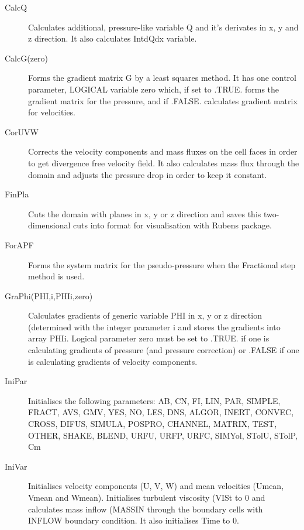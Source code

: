 \documentclass[10pt]{article}
\newcommand*{\tc}{\ttfamily} %
\begin{document}
\begin{description}
    \item[\tc CalcQ] Calculates additional, pressure-like variable
      Q and it's derivates in x, y and z direction. It also calculates
      IntdQdx variable. 

    \item[\tc CalcG(zero)] Forms the gradient matrix {\tc G} by a 
      least squares method. It has one control parameter, LOGICAL
      variable {\tc zero} which, if set to {\tc .TRUE.} forms
      the gradient matrix for the pressure, and if {\tc .FALSE.}
      calculates gradient matrix for velocities.

    \item[\tc CorUVW] Corrects the velocity components and
      mass fluxes on the cell faces in order to get divergence
      free velocity field. It also calculates mass flux through
      the domain and adjusts the pressure drop in order to keep
      it constant.

    \item[\tc FinPla] Cuts the domain with planes in x, y 
      or z direction and saves this two-dimensional cuts into
      format for visualisation with Rubens package.

    \item[\tc ForAPF] Forms the system matrix for the 
      pseudo-pressure when the Fractional step method is 
      used.

    \item[\tc GraPhi(PHI,i,PHIi,zero)] Calculates gradients
      of generic variable {\tc PHI} in x, y or z direction
      (determined with the integer parameter {\tc i} and stores 
      the gradients into array {\tc PHIi}. Logical parameter
      {\tc zero} must be set to {\tc .TRUE.} if one is calculating
      gradients of pressure (and pressure correction) or 
      {\tc .FALSE} if one is calculating gradients of velocity
      components.

    \item[\tc IniPar] Initialises the following parameters:
      {\tc AB}, {\tc CN}, {\tc FI}, {\tc LIN}, {\tc PAR}, 
      {\tc SIMPLE}, {\tc FRACT}, {\tc AVS}, {\tc GMV}, 
      {\tc YES}, {\tc NO}, {\tc LES}, {\tc DNS}, {\tc ALGOR}, 
      {\tc INERT}, {\tc CONVEC}, {\tc CROSS}, {\tc DIFUS}, 
      {\tc SIMULA}, {\tc POSPRO}, {\tc CHANNEL}, 
      {\tc MATRIX}, {\tc TEST}, {\tc OTHER}, {\tc SHAKE}, 
      {\tc BLEND}, {\tc URFU}, {\tc URFP}, {\tc URFC}, 
      {\tc SIMYol}, {\tc STolU}, {\tc STolP}, {\tc Cm}

    \item[\tc IniVar] Initialises velocity components ({\tc U},
      {\tc V}, {\tc W}) and mean velocities ({\tc Umean}, {\tc Vmean}
      and {\tc Wmean}). Initialises turbulent viscosity ({\tc VISt}
      to $0$ and calculates mass inflow ({\tc MASSIN} through the 
      boundary cells 
      with {\tc INFLOW} boundary condition. It also initialises 
      {\tc Time} to $0$.


\end{description}
\end{document}
